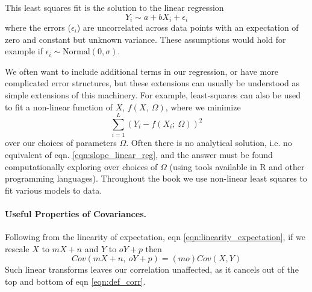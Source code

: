 This least squares fit is the solution to the linear regression
\begin{equation}
Y_i \sim a+ b X_i + \epsilon_i  
\end{equation}
where the errors ($\epsilon_i$) are uncorrelated across data points
with an expectation of zero and constant but unknown variance. These
assumptions would hold for example if $\epsilon_i \sim \textrm{Normal}(0,\sigma)$.


We often want to include additional terms in our regression, or have
more complicated error structures, but these
extensions can usually be understood as simple extensions of this
machinery. For example, least-squares can also be used to fit a non-linear
function of $X$, $f(X,~\Omega)$, 
where we minimize 
\begin{equation}
\sum_{i=1}^L  (Y_i  -f(X_i; ~\Omega ))^2
\end{equation}
over our choices of parameters $\Omega$. Often there is no analytical
solution, i.e. no equivalent of eqn. \ref{eqn:slope_linear_reg}, and
the answer must be found computationally exploring over choices of
$\Omega$ (using tools available in
R and other programming languages). Throughout the book we use
non-linear least squares to fit various models to data.



\paragraph{Useful Properties of Covariances.}
Following from the linearity of expectation, eqn
\eqref{eqn:linearity_expectation}, if we rescale $X$ to $mX+n$ and
$Y$ to $oY+p$ then
\begin{equation}
Cov(mX+n,~oY+p) = (mo) Cov(X,Y) 
\end{equation}
Such linear transforms leaves our correlation unaffected, as it
cancels out of the top and bottom of eqn \eqref{eqn:def_corr}.

